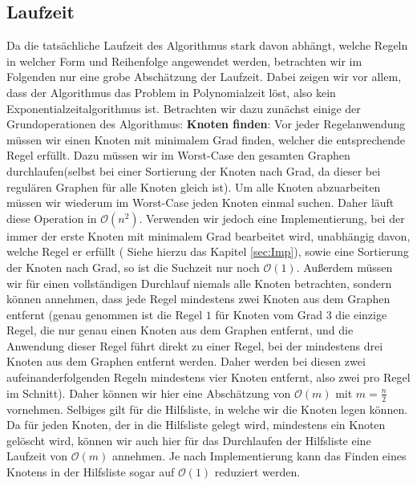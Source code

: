 \documentclass[12pt,onecolumn, notitlepage]{scrartcl}
\begin{document}
\subsection{Laufzeit}
Da die tatsächliche Laufzeit des Algorithmus stark davon abhängt, welche Regeln in welcher Form und Reihenfolge angewendet werden, betrachten wir im Folgenden nur eine grobe Abschätzung der Laufzeit. Dabei zeigen wir vor allem, dass der Algorithmus das Problem in Polynomialzeit löst, also kein Exponentialzeitalgorithmus ist. \newline
Betrachten wir dazu zunächst einige der Grundoperationen des Algorithmus:\newline \newline
\textbf{Knoten finden}: Vor jeder Regelanwendung müssen wir einen Knoten mit minimalem Grad finden, welcher die entsprechende Regel erfüllt. Dazu müssen wir im Worst-Case den gesamten Graphen durchlaufen(selbst bei einer Sortierung der Knoten nach Grad, da dieser bei regulären Graphen für alle Knoten gleich ist). Um alle Knoten abzuarbeiten müssen wir wiederum im Worst-Case jeden Knoten einmal suchen. Daher läuft diese Operation in $\mathcal O(n^2)$. Verwenden wir jedoch eine Implementierung, bei der immer der erste Knoten mit minimalem Grad bearbeitet wird, unabhängig davon, welche Regel er erfüllt ( Siehe hierzu das Kapitel \ref{sec:Imp}), sowie eine Sortierung der Knoten nach Grad, so ist die Suchzeit nur noch $\mathcal O(1)$. Außerdem müssen wir für einen vollständigen Durchlauf niemals alle Knoten betrachten, sondern können annehmen, dass jede Regel mindestens zwei Knoten aus dem Graphen entfernt (genau genommen ist die Regel $1$ für Knoten vom Grad $3$ die einzige Regel, die nur genau einen Knoten aus dem Graphen entfernt, und die Anwendung dieser Regel führt direkt zu einer Regel, bei der mindestens drei Knoten aus dem Graphen entfernt werden. Daher werden bei diesen zwei aufeinanderfolgenden Regeln mindestens vier Knoten entfernt, also zwei pro Regel im Schnitt).
Daher können wir hier eine Abschätzung von $\mathcal O(m)$ mit $ m = \frac{n}{2}$ vornehmen. \newline
Selbiges gilt für die Hilfsliste, in welche wir die Knoten legen können. Da für jeden Knoten, der in die Hilfsliste gelegt wird, mindestens ein Knoten gelöscht wird, können wir auch hier für das Durchlaufen der Hilfsliste eine Laufzeit von $\mathcal O(m)$ annehmen. Je nach Implementierung kann das Finden eines Knotens in der Hilfsliste sogar auf $\mathcal O(1)$ reduziert werden.\newline
\end{document}
